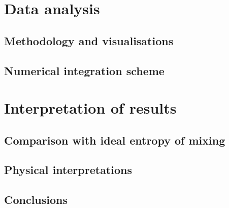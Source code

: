 \documentclass{article}
\begin{document}
\newpage

\section{Data analysis}

\subsection{Methodology and visualisations}

\subsection{Numerical integration scheme}

\newpage

\section{Interpretation of results}

\subsection{Comparison with ideal entropy of mixing}

\subsection{Physical interpretations}

\subsection{Conclusions}
\end{document}
